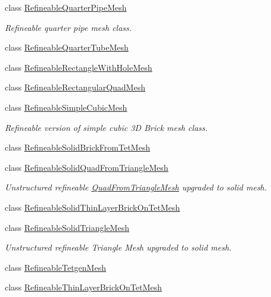 \begin{DoxyCompactItemize}
\item 
class \hyperlink{classoomph_1_1RefineableQuarterPipeMesh}{Refineable\+Quarter\+Pipe\+Mesh}
\begin{DoxyCompactList}\small\item\em Refineable quarter pipe mesh class. \end{DoxyCompactList}\item 
class \hyperlink{classoomph_1_1RefineableQuarterTubeMesh}{Refineable\+Quarter\+Tube\+Mesh}
\item 
class \hyperlink{classoomph_1_1RefineableRectangleWithHoleMesh}{Refineable\+Rectangle\+With\+Hole\+Mesh}
\item 
class \hyperlink{classoomph_1_1RefineableRectangularQuadMesh}{Refineable\+Rectangular\+Quad\+Mesh}
\item 
class \hyperlink{classoomph_1_1RefineableSimpleCubicMesh}{Refineable\+Simple\+Cubic\+Mesh}
\begin{DoxyCompactList}\small\item\em Refineable version of simple cubic 3D Brick mesh class. \end{DoxyCompactList}\item 
class \hyperlink{classoomph_1_1RefineableSolidBrickFromTetMesh}{Refineable\+Solid\+Brick\+From\+Tet\+Mesh}
\item 
class \hyperlink{classoomph_1_1RefineableSolidQuadFromTriangleMesh}{Refineable\+Solid\+Quad\+From\+Triangle\+Mesh}
\begin{DoxyCompactList}\small\item\em Unstructured refineable \hyperlink{classoomph_1_1QuadFromTriangleMesh}{Quad\+From\+Triangle\+Mesh} upgraded to solid mesh. \end{DoxyCompactList}\item 
class \hyperlink{classoomph_1_1RefineableSolidThinLayerBrickOnTetMesh}{Refineable\+Solid\+Thin\+Layer\+Brick\+On\+Tet\+Mesh}
\item 
class \hyperlink{classoomph_1_1RefineableSolidTriangleMesh}{Refineable\+Solid\+Triangle\+Mesh}
\begin{DoxyCompactList}\small\item\em Unstructured refineable Triangle Mesh upgraded to solid mesh. \end{DoxyCompactList}\item 
class \hyperlink{classoomph_1_1RefineableTetgenMesh}{Refineable\+Tetgen\+Mesh}
\item 
class \hyperlink{classoomph_1_1RefineableThinLayerBrickOnTetMesh}{Refineable\+Thin\+Layer\+Brick\+On\+Tet\+Mesh}

\end{DoxyCompactItemize}
